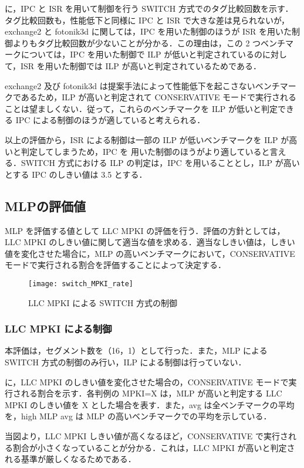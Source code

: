 に，IPC と ISR を用いて制御を行う SWITCH 方式でのタグ比較回数を示す．タグ比較回数も，性能低下と同様に IPC と ISR で大きな差は見られないが，exchange2 と fotonik3d に関しては，IPC を用いた制御のほうが ISR を用いた制御よりもタグ比較回数が少ないことが分かる．この理由は，この 2 つベンチマークについては，IPC を用いた制御で ILP が低いと判定されているのに対して，ISR を用いた制御では ILP が高いと判定されているためである．

exchange2 及び fotonik3d は提案手法によって性能低下を起こさないベンチマークであるため，ILP が高いと判定されて CONSERVATIVE モードで実行されることは望ましくない．従って，これらのベンチマークを ILP が低いと判定できる IPC による制御のほうが適していると考えられる．

以上の評価から，ISR による制御は一部の ILP が低いベンチマークを ILP が高いと判定してしまうため，IPC を 用いた制御のほうがより適していると言える．SWITCH 方式における ILP の判定は，IPC を用いることとし，ILP が高いとする IPC のしきい値は 3.5 とする．

\subsection{MLPの評価値}
MLP を評価する値として LLC MPKI の評価を行う．評価の方針としては，LLC MPKI のしきい値に関して適当な値を求める．適当なしきい値は，しきい値を変化させた場合に，MLP の高いベンチマークにおいて，CONSERVATIVE モードで実行される割合を評価することによって決定する．

\begin{figure}[htb]
  \centering
  \texttt{[image: switch\_MPKI\_rate]}
  \caption{LLC MPKI による SWITCH 方式の制御}
  \label{fig:switch_MPKI_rate}
\end{figure}

\subsubsection{LLC MPKI による制御}
本評価は，セグメント数を（16，1）として行った．また，MLP による SWITCH 方式の制御のみ行い，ILP による制御は行っていない．

に，LLC MPKI のしきい値を変化させた場合の，CONSERVATIVE モードで実行される割合を示す．各判例の MPKI=X は，MLP が高いと判定する LLC MPKI のしきい値を X とした場合を表す．また，avg は全ベンチマークの平均を，high MLP avg は MLP の高いベンチマークでの平均を示している． 

当図より，LLC MPKI しきい値が高くなるほど，CONSERVATIVE で実行される割合が小さくなっていることが分かる．これは，LLC MPKI が高いと判定される基準が厳しくなるためである．

